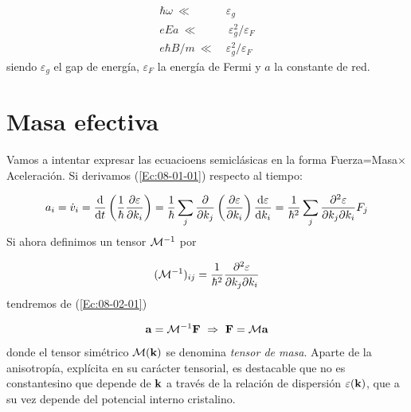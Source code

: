 \begin{equation}
	\begin{split}
	\hbar \omega \ \ll \ & \varepsilon_g \\
	e E a \ \ll & \ \varepsilon_g^2 / \varepsilon_F \\
	e\hbar B/m \ \ll \ & \varepsilon_g^2 / \varepsilon_F
	\end{split}
\end{equation}
siendo $\varepsilon_g$ el gap de energía, $\varepsilon_F$ la energía de Fermi y $a$ la constante de red.

\section{Masa efectiva}

Vamos a intentar expresar las ecuacioens semiclásicas en la forma Fuerza=Masa$\times$Aceleración. Si derivamos (\ref{Ec:08-01-01}) respecto al tiempo:

\begin{equation}
	a_i = \dot{v}_i  = \frac{\mathrm{d} }{\mathrm{d} t} \left( \frac{1}{\hbar} \frac{\partial \varepsilon}{\partial k_i} \right) = \frac{1}{\hbar} \sum_j \frac{\partial }{\partial k_j} \left( \frac{\partial \varepsilon}{\partial k_i} \right) \frac{\mathrm{d} \varepsilon}{\mathrm{d} k_i} = \frac{1}{\hbar^2} \sum_j \frac{\partial ^2 \varepsilon}{\partial k_j \partial k_i} F_j \label{Ec:08-02-01}
\end{equation}
Si ahora definimos un tensor $\mathcal{M}^{-1}$ por 

\begin{equation}
	(\mathcal{M}^{-1})_{ij} = \frac{1}{\hbar^2} \frac{\partial ^2 \varepsilon}{\partial k_j \partial k_i}
\end{equation}
tendremos de (\ref{Ec:08-02-01}) 

\begin{equation}
	\mathbf{a} = \mathcal{M}^{-1} \mathbf{F} \ \Rightarrow \ \mathbf{F} = \mathcal{M} \mathbf{a}
\end{equation}
donde el tensor simétrico $\mathcal{M} (\mathbf{k})$ se denomina \textit{tensor de masa}. Aparte de la anisotropía, explícita en su carácter tensorial, es destacable que no es constantesino que depende de $\mathbf{k}$ a través de la relación de dispersión $\varepsilon(\mathbf{k})$, que a su vez depende del potencial interno cristalino.

